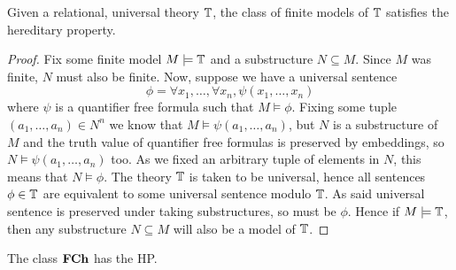 \begin{prop}
  Given a relational, universal theory $\mathbb{T}$, the class of finite models of $\mathbb{T}$ satisfies
  the hereditary property.
\end{prop}
\begin{proof}
  Fix some finite model $M \models \mathbb{T}$ and a substructure
  $N \subseteq M$. Since $M$ was finite, $N$ must also be finite. Now, suppose we have a universal
  sentence
  \begin{equation*}
    \phi = \forall x_1, \dots, \forall x_n, \psi(x_1,\dots,x_n)
  \end{equation*}
  where $\psi$ is a quantifier free formula such that $M \models \phi$. Fixing some tuple $(a_1,\dots,a_n) \in N^n$ we
  know that $M \models \psi(a_1,\dots,a_n)$, but $N$ is a substructure of $M$ and the truth value
  of quantifier free formulas is preserved by embeddings, so $N \models \psi(a_1,\dots,a_n)$ too.
  As we fixed an arbitrary tuple of elements in $N$, this means that $N \models \phi$.
  The theory $\mathbb{T}$ is taken to be universal, hence all sentences $\phi \in \mathbb{T}$ are
  equivalent to some universal sentence modulo $\mathbb{T}$. As said universal sentence is preserved
  under taking substructures, so must be $\phi$. Hence if $M \models \mathbb{T}$, then any substructure
  $N \subseteq M$ will also be a model of $\mathbb{T}$.
\end{proof}

\begin{cor}
  The class $\textbf{FCh}$ has the HP.
\end{cor}

